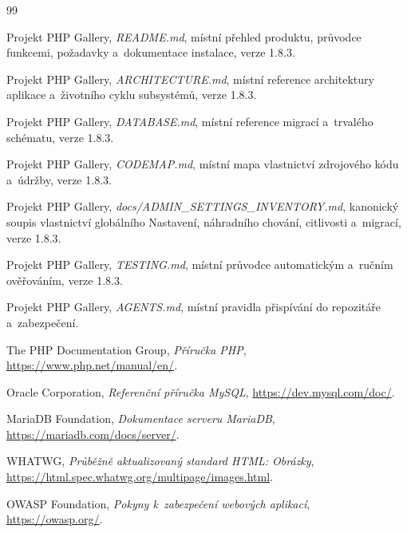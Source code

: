 \documentclass[11pt,a4paper]{article}
\newcommand{\version}{1.8.3}
\begin{document}
\begin{thebibliography}{99}

Projekt PHP Gallery, \emph{README.md}, místní přehled produktu, průvodce
funkcemi, požadavky a~dokumentace instalace, verze \version.

Projekt PHP Gallery, \emph{ARCHITECTURE.md}, místní reference architektury
aplikace a~životního cyklu subsystémů, verze \version.

Projekt PHP Gallery, \emph{DATABASE.md}, místní reference migrací a~trvalého
schématu, verze \version.

Projekt PHP Gallery, \emph{CODEMAP.md}, místní mapa vlastnictví zdrojového kódu
a~údržby, verze \version.

Projekt PHP Gallery, \emph{docs/ADMIN\_SETTINGS\_INVENTORY.md}, kanonický soupis
vlastnictví globálního Nastavení, náhradního chování, citlivosti a~migrací,
verze \version.

Projekt PHP Gallery, \emph{TESTING.md}, místní průvodce automatickým a~ručním
ověřováním, verze \version.

Projekt PHP Gallery, \emph{AGENTS.md}, místní pravidla přispívání do repozitáře
a~zabezpečení.

The PHP Documentation Group, \emph{Příručka PHP},
\url{https://www.php.net/manual/en/}.

Oracle Corporation, \emph{Referenční příručka MySQL},
\url{https://dev.mysql.com/doc/}.

MariaDB Foundation, \emph{Dokumentace serveru MariaDB},
\url{https://mariadb.com/docs/server/}.

WHATWG, \emph{Průběžně aktualizovaný standard HTML: Obrázky},
\url{https://html.spec.whatwg.org/multipage/images.html}.

OWASP Foundation, \emph{Pokyny k~zabezpečení webových aplikací},
\url{https://owasp.org/}.

\end{thebibliography}

\clearpage
{}
{}
\printindex
\end{document}

